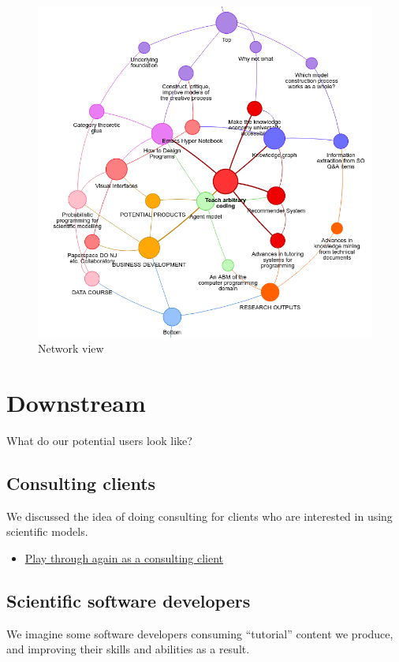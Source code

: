 \documentclass[11pt]{article}
\begin{document}
\begin{figure}[htbp]
\centering
\includegraphics[width=\textwidth]{org-roam-server-3oct2020.png}
\caption{Network view}
\end{figure}
\section{Downstream}
\label{sec:orgf7fae81}
What do our potential users look like?

\subsection{Consulting clients}
\label{sec:orgbf9171a}
We discussed the idea of doing consulting for clients who are
interested in using scientific models.

\begin{itemize}
\item \href{0caba40b-2561-4143-b2b1-55f3ddc3201b}{Play through again as a consulting client}
\end{itemize}
\subsection{Scientific software developers}
\label{sec:org26b7604}
We imagine some software developers consuming “tutorial” content we
produce, and improving their skills and abilities as a result.
\end{document}
